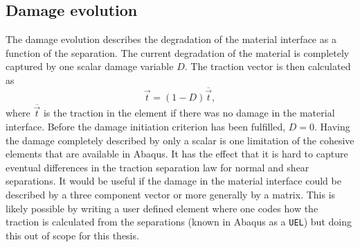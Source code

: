 \documentclass[grain_boundary_law.tex]{subfiles}
\begin{document}
\subsection{Damage evolution}
\label{sec:dmg_evo}

The damage evolution describes the degradation of the material interface as a function of the separation. The current degradation of the material is completely captured by one scalar damage variable $D$. The traction vector is then calculated as 
%
\[ \vec{t} = (1 - D) \overline{\vec{t}}, \]
%
 where $\overline{\vec{t}}$ is the traction in the element if there was no damage in the material interface. Before the damage initiation criterion has been fulfilled, $D = 0$. Having the damage completely described by only a scalar is one limitation of the cohesive elements that are available in Abaqus. It has the effect that it is hard to capture eventual differences in the traction separation law for normal and shear separations. It would be useful if the damage in the material interface could be described by a three component vector or more generally by a matrix. This is likely possible by writing a user defined element where one codes how the traction is calculated from the separations (known in Abaqus as a \texttt{UEL}) but doing this out of scope for this thesis.
\end{document}
